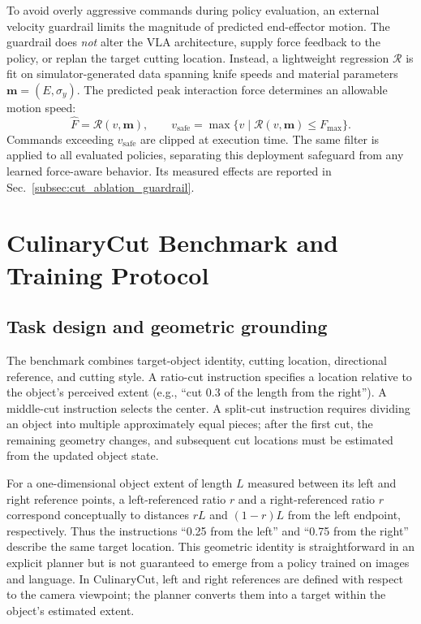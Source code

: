 To avoid overly aggressive commands during policy evaluation, an external velocity guardrail limits the magnitude of predicted end-effector motion. The guardrail does \emph{not} alter the VLA architecture, supply force feedback to the policy, or replan the target cutting location. Instead, a lightweight regression $\mathcal{R}$ is fit on simulator-generated data spanning knife speeds and material parameters $\mathbf{m}=(E,\sigma_y)$. The predicted peak interaction force determines an allowable motion speed:
\begin{equation}\label{eq:cut_guardrail}
  \hat F=\mathcal{R}(v,\mathbf{m}),\qquad
  v_{\mathrm{safe}}=\max\bigl\{v\mid
    \mathcal{R}(v,\mathbf{m})\le F_{\max}\bigr\}.
\end{equation}
Commands exceeding $v_{\mathrm{safe}}$ are clipped at execution time. The same filter is applied to all evaluated policies, separating this deployment safeguard from any learned force-aware behavior. Its measured effects are reported in Sec.~\ref{subsec:cut_ablation_guardrail}.

\FloatBarrier

\section{CulinaryCut Benchmark and Training Protocol}
\label{sec:cut_benchmark}

\subsection{Task design and geometric grounding}
\label{subsec:cut_task_design}

The benchmark combines target-object identity, cutting location, directional reference, and cutting style. A ratio-cut instruction specifies a location relative to the object's perceived extent (e.g., ``cut 0.3 of the length from the right''). A middle-cut instruction selects the center. A split-cut instruction requires dividing an object into multiple approximately equal pieces; after the first cut, the remaining geometry changes, and subsequent cut locations must be estimated from the updated object state.

For a one-dimensional object extent of length $L$ measured between its left and right reference points, a left-referenced ratio $r$ and a right-referenced ratio $r$ correspond conceptually to distances $rL$ and $(1-r)L$ from the left endpoint, respectively. Thus the instructions ``0.25 from the left'' and ``0.75 from the right'' describe the same target location. This geometric identity is straightforward in an explicit planner but is not guaranteed to emerge from a policy trained on images and language. In CulinaryCut, left and right references are defined with respect to the camera viewpoint; the planner converts them into a target within the object's estimated extent.

